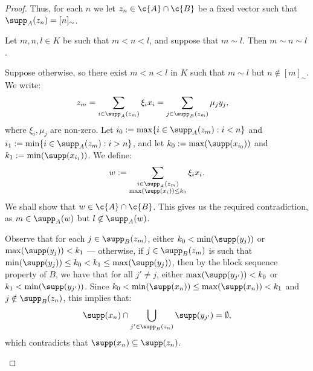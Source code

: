 \documentclass[11pt,reqno]{amsart}
\begin{document}
\begin{proof}
    Thus, for each $n$ we let $z_n \in \c{A} \cap \c{B}$ be a fixed vector such that $\supp_A(z_n) = [n]_\sim$. 

    \begin{claim}
    \label{claim:eq.classes.are.blocks}
        Let $m,n,l \in K$ be such that $m < n < l$, and suppose that $m \sim l$. Then $m \sim n \sim l$.
    \end{claim}

    \begin{midproof}
        Suppose otherwise, so there exist $m < n < l$ in $K$ such that $m \sim l$ but $n \notin [m]_\sim$. We write:
        \begin{align*}
            z_m &= \sum_{i \in \supp_A(z_m)} \xi_ix_i = \sum_{j \in \supp_B(z_m)} \mu_jy_j,
        \end{align*} 
        where $\xi_i,\mu_j$ are non-zero. Let $i_0 := \max\{i \in \supp_A(z_m) : i < n\}$ and $i_1 := \min\{i \in \supp_A(z_m) : i > n\}$, and let $k_0 := \max(\supp(x_{i_0}))$ and $k_1 := \min(\supp(x_{i_1}))$. We define:
        \begin{align*}
            w := \sum_{\substack{i \in \supp_A(z_m) \\ \max(\supp(x_i)) \leq k_0}} \xi_ix_i.
        \end{align*}
        We shall show that $w \in \c{A} \cap \c{B}$. This gives us the required contradiction, as $m \in \supp_A(w)$ but $l \not\in \supp_A(w)$. 

        Observe that for each $j \in \supp_B(z_m)$, either $k_0 < \min(\supp(y_j))$ or $\max(\supp(y_j)) < k_1$ --- otherwise, if $j \in \supp_B(z_m)$ is such that $\min(\supp(y_j)) \leq k_0 < k_1 \leq \max(\supp(y_j))$, then by the block sequence property of $B$, we have that for all $j' \neq j$, either $\max(\supp(y_{j'})) < k_0$ or $k_1 < \min(\supp(y_{j'}))$. Since $k_0 < \min(\supp(x_n)) \leq \max(\supp(x_n)) < k_1$ and $j \notin \supp_B(z_n)$, this implies that:
        \begin{align*}
            \supp(x_n) \cap \bigcup_{j' \in \supp_B(z_n)} \supp(y_{j'}) = \emptyset,
        \end{align*}
        which contradicts that $\supp(x_n) \subseteq \supp(z_n)$. 


\end{midproof}
\end{proof}
\end{document}
